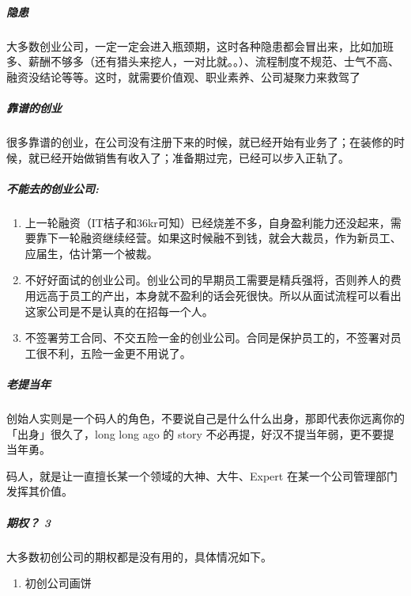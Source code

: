\documentclass[letterpaper,10pt,english]{sphinxmanual}
\begin{document}
\subparagraph{隐患}
\label{\detokenize{chapter_interview/not_go:id4}}
大多数创业公司，一定一定会进入瓶颈期，这时各种隐患都会冒出来，比如加班多、薪酬不够多（还有猎头来挖人，一对比就。。）、流程制度不规范、士气不高、融资没结论等等。这时，就需要价值观、职业素养、公司凝聚力来救驾了


\subparagraph{靠谱的创业}
\label{\detokenize{chapter_interview/not_go:id5}}
很多靠谱的创业，在公司没有注册下来的时候，就已经开始有业务了；在装修的时候，就已经开始做销售有收入了；准备期过完，已经可以步入正轨了。
%
\begin{footnote}[848]\sphinxAtStartFootnote
{}
%
\end{footnote}


\subparagraph{不能去的创业公司:}
\label{\detokenize{chapter_interview/not_go:id6}}\begin{enumerate}
%
\item {} 
上一轮融资（IT桔子和36kr可知）已经烧差不多，自身盈利能力还没起来，需要靠下一轮融资继续经营。如果这时候融不到钱，就会大裁员，作为新员工、应届生，估计第一个被裁。

\item {} 
不好好面试的创业公司。创业公司的早期员工需要是精兵强将，否则养人的费用远高于员工的产出，本身就不盈利的话会死很快。所以从面试流程可以看出这家公司是不是认真的在招每一个人。

\item {} 
不签署劳工合同、不交五险一金的创业公司。合同是保护员工的，不签署对员工很不利，五险一金更不用说了。

\end{enumerate}


\subparagraph{老提当年}
\label{\detokenize{chapter_interview/not_go:id7}}
创始人实则是一个码人的角色，不要说自己是什么什么出身，那即代表你远离你的「出身」很久了，long
long ago 的 story 不必再提，好汉不提当年弱，更不要提当年勇。

码人，就是让一直擅长某一个领域的大神、大牛、Expert
在某一个公司管理部门发挥其价值。


\subparagraph{期权？ 3\sphinxfootnotemark[849]}
\label{\detokenize{chapter_interview/not_go:id8}}%
\begin{footnotetext}[849]\sphinxAtStartFootnote
{}
%
\end{footnotetext}\ignorespaces 
大多数初创公司的期权都是没有用的，具体情况如下。
\begin{enumerate}
%
\item {} 
初创公司画饼

\end{enumerate}
\end{document}
